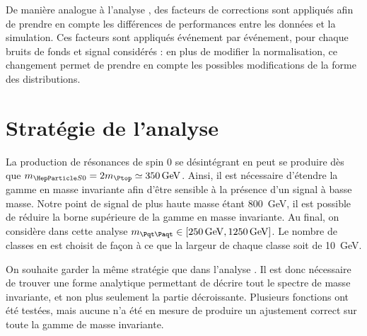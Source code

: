 \bigskip


De manière analogue à l'analyse \zprime, des facteurs de corrections sont appliqués afin de prendre en compte les différences de performances entre les données et la simulation. Ces facteurs sont appliqués événement par événement, pour chaque bruits de fonds et signal considérés : en plus de modifier la normalisation, ce changement permet de prendre en compte les possibles modifications de la forme des distributions.

\section{Stratégie de l'analyse}

La production de résonances de spin 0 se désintégrant en \ttbar peut se produire dès que $\msz = 2 m_{\Ptop} \simeq \SI{350}{\GeV}$. Ainsi, il est nécessaire d'étendre la gamme en masse invariante afin d'être sensible à la présence d'un signal à basse masse. Notre point de signal de plus haute masse étant \SI{800}{\GeV}, il est possible de réduire la borne supérieure de la gamme en masse invariante. Au final, on considère dans cette analyse $\mtt \in \left[\SI{250}{\GeV}, \SI{1250}{\GeV}\right]$. Le nombre de classes en \mtt est choisit de façon à ce que la largeur de chaque classe soit de \SI{10}{\GeV}.

On souhaite garder la même stratégie que dans l'analyse \zprime. Il est donc nécessaire de trouver une forme analytique permettant de décrire tout le spectre de masse invariante, et non plus seulement la partie décroissante. Plusieurs fonctions ont été testées, mais aucune n'a été en mesure de produire un ajustement correct sur toute la gamme de masse invariante.

